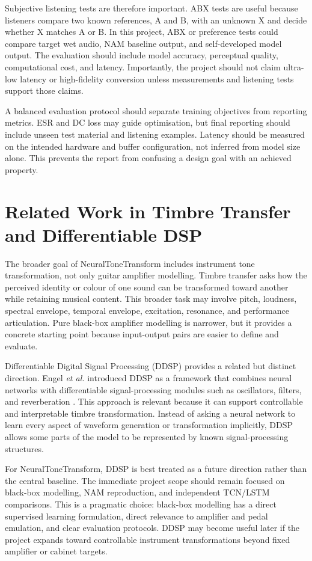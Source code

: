 \documentclass[conference]{IEEEtran}
\begin{document}
Subjective listening tests are therefore important. ABX tests are useful because listeners compare two known references, A and B, with an unknown X and decide whether X matches A or B. In this project, ABX or preference tests could compare target wet audio, NAM baseline output, and self-developed model output. The evaluation should include model accuracy, perceptual quality, computational cost, and latency. Importantly, the project should not claim ultra-low latency or high-fidelity conversion unless measurements and listening tests support those claims.

A balanced evaluation protocol should separate training objectives from reporting metrics. ESR and DC loss may guide optimisation, but final reporting should include unseen test material and listening examples. Latency should be measured on the intended hardware and buffer configuration, not inferred from model size alone. This prevents the report from confusing a design goal with an achieved property.

\section{Related Work in Timbre Transfer and Differentiable DSP}

The broader goal of NeuralToneTransform includes instrument tone transformation, not only guitar amplifier modelling. Timbre transfer asks how the perceived identity or colour of one sound can be transformed toward another while retaining musical content. This broader task may involve pitch, loudness, spectral envelope, temporal envelope, excitation, resonance, and performance articulation. Pure black-box amplifier modelling is narrower, but it provides a concrete starting point because input-output pairs are easier to define and evaluate.

Differentiable Digital Signal Processing (DDSP) provides a related but distinct direction. Engel \emph{et al.} introduced DDSP as a framework that combines neural networks with differentiable signal-processing modules such as oscillators, filters, and reverberation \cite{engel2020ddsp}. This approach is relevant because it can support controllable and interpretable timbre transformation. Instead of asking a neural network to learn every aspect of waveform generation or transformation implicitly, DDSP allows some parts of the model to be represented by known signal-processing structures.

For NeuralToneTransform, DDSP is best treated as a future direction rather than the central baseline. The immediate project scope should remain focused on black-box modelling, NAM reproduction, and independent TCN/LSTM comparisons. This is a pragmatic choice: black-box modelling has a direct supervised learning formulation, direct relevance to amplifier and pedal emulation, and clear evaluation protocols. DDSP may become useful later if the project expands toward controllable instrument transformations beyond fixed amplifier or cabinet targets.
\end{document}
